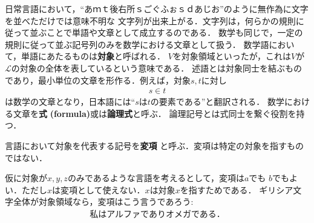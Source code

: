 	日常言語において，``あｍｔ後右所ｓごぐふぉｓｄあじお''のように無作為に文字を並べただけでは意味不明な
	文字列が出来上がる．文字列は，何らかの規則に従って並ぶことで単語や文章として成立するのである．
	数学も同じで，一定の規則に従って並ぶ記号列のみを数学における文章として扱う．
	数学語において，単語にあたるものは{\bf 対象}と呼ばれる．
	$V$を対象領域といったが，これは$V$が$\mathcal{L}$の対象の全体を表しているという意味である．
	述語とは対象同士を結ぶものであり，最小単位の文章を形作る．例えば，対象$s,t$に対し
	\begin{align}
		s \in t
	\end{align}
	は数学の文章となり，日本語には``$s$は$t$の要素である''と翻訳される．
	数学における文章を{\bf 式}
	{\bf (formula)}或は{\bf 論理式}と呼ぶ．
	論理記号とは式同士を繋ぐ役割を持つ．
	
	\begin{screen}
		\begin{dfn}[変項]
			言語において対象を代表する記号を{\bf 変項}
			と呼ぶ．変項は特定の対象を指すものではない．
		\end{dfn}
	\end{screen}
	
	仮に対象が$x,y,z$のみであるような言語を考えるとして，変項は$a$でも
	$b$でもよい．ただし$x$は変項として使えない．$x$は対象$x$を指すためである．
	ギリシア文字全体が対象領域なら，変項はこう言うであろう:
	\begin{align}
		\mbox{私はアルファでありオメガである．}
	\end{align}
	
